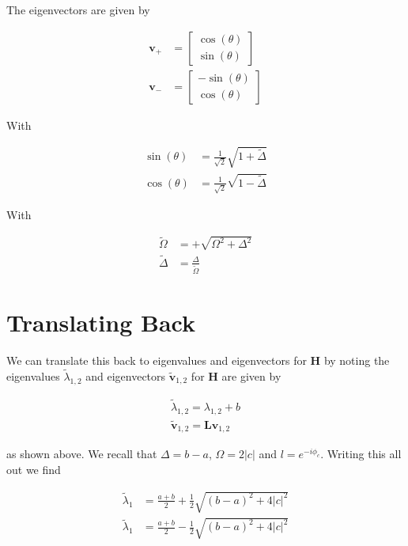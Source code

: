 \documentclass[12pt]{article}
\newcommand{\bv}[1]{\boldsymbol{#1}}
\begin{document}
The eigenvectors are given by

\begin{align}
\bv{v}_+ &= 
\begin{bmatrix}
\cos(\theta)\\ \sin(\theta)
\end{bmatrix}\\
\bv{v}_- &= 
\begin{bmatrix}
-\sin(\theta)\\ \cos(\theta)
\end{bmatrix}
\end{align}

With

\begin{align}
\sin(\theta) &= \frac{1}{\sqrt{2}} \sqrt{1+\tilde{\Delta}}\\
\cos(\theta) &= \frac{1}{\sqrt{2}} \sqrt{1-\tilde{\Delta}}
\end{align}

With

\begin{align}
\tilde{\Omega} &= +\sqrt{\Omega^2+\Delta^2}\\
\tilde{\Delta} &= \frac{\Delta}{\tilde{\Omega}}
\end{align}

\section{Translating Back}

We can translate this back to eigenvalues and eigenvectors for $\bv{H}$ by noting the eigenvalues $\tilde{\lambda}_{1,2}$ and eigenvectors $\tilde{\bv{v}}_{1,2}$ for $\bv{H}$ are given by

\begin{align}
\tilde{\lambda}_{1,2} = \lambda_{1,2} + b\\
\tilde{\bv{v}}_{1,2} = \bv{L}\bv{v}_{1,2}
\end{align}

as shown above. We recall that $\Delta = b-a$, $\Omega = 2|c|$ and $l = e^{-i\phi_c}$. Writing this all out we find

\begin{align}
\tilde{\lambda}_1 &= \frac{a+b}{2} + \frac{1}{2}\sqrt{(b-a)^2 + 4|c|^2}\\
\tilde{\lambda}_1 &= \frac{a+b}{2} - \frac{1}{2}\sqrt{(b-a)^2 + 4|c|^2}\\
\end{align}
\end{document}
